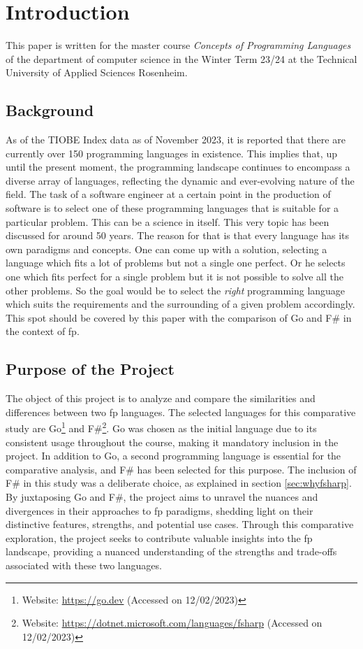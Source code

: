 \chapter{Introduction}\label{chap:introduction}
This paper is written for the master course \textit{Concepts of Programming Languages} of the department of computer science in the Winter Term 23/24 at the Technical University of Applied Sciences Rosenheim.
    \section{Background}\label{sec:background}
As of the TIOBE Index data as of November 2023, it is reported that there are currently over 150 programming languages in existence. This implies that, up until the present moment, the programming landscape continues to encompass a diverse array of languages, reflecting the dynamic and ever-evolving nature of the field.\cite{tiobeindex} The task of a software engineer at a certain point in the production of software is to select one of these programming languages that is suitable for a particular problem. This can be a science in itself. This very topic has been discussed for around 50 years.\cite{Tharp1982}
The reason for that is that every language has its own paradigms and concepts. One can come up with a solution, selecting a language which fits a lot of problems but not a single one perfect. Or he selects one which fits perfect for a single problem but it is not possible to solve all the other problems.
So the goal would be to select the \textit{right} programming language which suits the requirements and the surrounding of a given problem accordingly.
This spot should be covered by this paper with the comparison of Go and F\# in the context of \ac{fp}.

    \section{Purpose of the Project}\label{sec:purpose}
    The object of this project is to analyze and compare the similarities and differences between two \ac{fp} languages. The selected languages for this comparative study are Go\footnote{Website: \url{https://go.dev} (Accessed on 12/02/2023)} and F\#\footnote{Website: \url{https://dotnet.microsoft.com/languages/fsharp} (Accessed on 12/02/2023)}. Go was chosen as the initial language due to its consistent usage throughout the course, making it mandatory inclusion in the project. 
    In addition to Go, a second programming language is essential for the comparative analysis, and F\# has been selected for this purpose. The inclusion of F\# in this study was a deliberate choice, as explained in section \ref{sec:whyfsharp}. By juxtaposing Go and F\#, the project aims to unravel the nuances and divergences in their approaches to \ac{fp} paradigms, shedding light on their distinctive features, strengths, and potential use cases. Through this comparative exploration, the project seeks to contribute valuable insights into the \ac{fp} landscape, providing a nuanced understanding of the strengths and trade-offs associated with these two languages.

